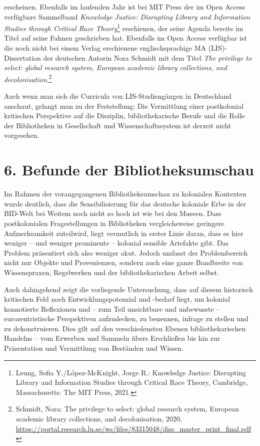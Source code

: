 \documentclass[a4paper,
fontsize=11pt,
oneside,
numbers=noperiodatend,
parskip=half-,
bibliography=totoc,
final
]{scrartcl}
\begin{document}
erscheinen. Ebenfalls im laufenden Jahr ist bei MIT Press der im Open
Access verfügbare Sammelband \emph{Knowledge Justice: Disrupting Library
and Information Studies through Critical Race Theory}\footnote{Leung,
  Sofia Y./López-McKnight, Jorge R.: Knowledge Justice: Disrupting
  Library and Information Studies through Critical Race Theory,
  Cambridge, Massachusetts: The MIT Press, 2021.} erschienen, der seine
Agenda bereits im Titel auf seine Fahnen geschrieben hat. Ebenfalls im
Open Access verfügbar ist die noch nicht bei einem Verlag erschienene
englischsprachige MA (LIS)-Dissertation der deutschen Autorin Nora
Schmidt mit dem Titel \emph{The privilege to select: global research
system, European academic library collections, and
decolonisation}.\footnote{Schmidt, Nora: The privilege to select: global
  research system, European academic library collections, and
  decolonisation, 2020,
  \url{https://portal.research.lu.se/ws/files/83315048/diss_master_print_final.pdf}}

Auch wenn man sich die Curricula von LIS-Studiengängen in Deutschland
anschaut, gelangt man zu der Feststellung: Die Vermittlung einer
postkolonial kritischen Perspektive auf die Disziplin, bibliothekarische
Berufe und die Rolle der Bibliotheken in Gesellschaft und
Wissenschaftssystem ist derzeit nicht vorgesehen.

\hypertarget{befunde-der-bibliotheksumschau}{%
\section{6. Befunde der
Bibliotheksumschau}\label{befunde-der-bibliotheksumschau}}

Im Rahmen der vorangegangenen Bibliotheksumschau zu kolonialen Kontexten
wurde deutlich, dass die Sensibilisierung für das deutsche koloniale
Erbe in der BID-Welt bei Weitem noch nicht so hoch ist wie bei den
Museen. Dass postkolonialen Fragestellungen in Bibliotheken
vergleichsweise geringere Aufmerksamkeit zuteilwird, liegt vermutlich in
erster Linie daran, dass es hier weniger -- und weniger prominente --
kolonial sensible Artefakte gibt. Das Problem präsentiert sich also
weniger akut. Jedoch umfasst der Problembereich nicht nur Objekte und
Provenienzen, sondern auch eine ganze Bandbreite von Wissenspraxen,
Regelwerken und der bibliothekarischen Arbeit selbst.

Auch dahingehend zeigt die vorliegende Untersuchung, dass auf diesem
historisch kritischen Feld noch Entwicklungspotenzial und -bedarf liegt,
um kolonial konnotierte Reflexionen und -- zum Teil unsichtbare und
unbewusste -- eurozentristische Perspektiven aufzudecken, zu benennen,
infrage zu stellen und zu dekonstruieren. Dies gilt auf den
verschiedensten Ebenen bibliothekarischen Handelns -- vom Erwerben und
Sammeln übers Erschließen bis hin zur Präsentation und Vermittlung von
Beständen und Wissen.
\end{document}
